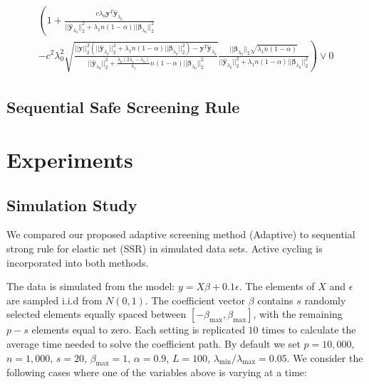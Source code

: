 \begin{gather}
    \begin{aligned}
        \left(1+\frac{c\lambda_0\boldsymbol y^T\hat{\boldsymbol y}_{\lambda_0}}{||\hat{\boldsymbol y}_{\lambda_0}||_2^2+\lambda_1n(1-\alpha)||\boldsymbol\beta_{\lambda_0}||_2^2}\right.\\
        \left.-c^2\lambda_0^2\sqrt{\frac{||\boldsymbol y||_2^2\left(||\hat{\boldsymbol y}_{\lambda_0}||_2^2+\lambda_1n(1-\alpha)||\boldsymbol\beta_{\lambda_0}||_2^2\right)-\boldsymbol y^T\hat{\boldsymbol y}_{\lambda_0}}{||\hat{\boldsymbol y}_{\lambda_0}||_2^2+\frac{\lambda_0(2\lambda_1-\lambda_0)}{\lambda_1}n(1-\alpha)||\boldsymbol\beta_{\lambda_0}||_2^2}}
        \frac{||\boldsymbol\beta_{\lambda_0}||_2\sqrt{\lambda_1n(1-\alpha)}}{||\hat{\boldsymbol y}_{\lambda_0}||_2^2+\lambda_1n(1-\alpha)||\boldsymbol\beta_{\lambda_0}||_2^2}\right)\vee0
    \end{aligned}
\end{gather}






\subsection{Sequential Safe Screening Rule}

\section{Experiments}

\subsection{Simulation Study}

We compared our proposed adaptive screening method (Adaptive) to sequential strong rule for elastic net (SSR) in simulated data sets. Active cycling is incorporated into both methods.

The data is simulated from the model: $y=X\beta+0.1\epsilon$. The elements of $X$ and $\epsilon$ are sampled i.i.d from $N(0,1)$. The coefficient vector $\beta$ contains $s$ randomly selected elements equally spaced between $[-\beta_{\max},\beta_{\max}]$, with the remaining $p-s$ elements equal to zero. Each setting is replicated $10$ times to calculate the average time needed to solve the coefficient path. By default we set $p=10,000$, $n=1,000$, $s=20$, $\beta_{\max}=1$, $\alpha=0.9$, $L=100$, $\lambda_{\min}/\lambda_{\max}=0.05$. We consider the following cases where one of the variables above is varying at a time:

